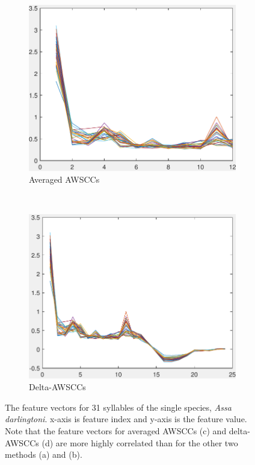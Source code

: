 \begin{figure}[htb!]
                \begin{subfigure}[b]{0.5\textwidth}
                \includegraphics[width=\textwidth]{image/Ch5/avgPWSCC.pdf}
                \caption{Averaged AWSCCs}
        \end{subfigure}%
        ~ 
        \begin{subfigure}[b]{0.5\textwidth}
                \includegraphics[width=\textwidth]{image/Ch5/deltaPWSCC.pdf}
                \caption{Delta-AWSCCs}
        \end{subfigure}
        \caption[The feature vectors for 31 syllables of the single species, \textit{Assa darlingtoni}]{The feature vectors for 31 syllables of the single species, \textit{Assa darlingtoni}. x-axis is feature index and y-axis
is the feature value. Note that the feature vectors for averaged AWSCCs (c) and delta-AWSCCs (d) are more highly correlated than for the other two methods (a) and (b).}       
        \label{fig:Ch5_feature}
\end{figure}


